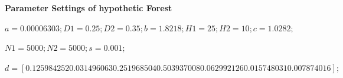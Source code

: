 \documentclass{mcmthesis}
\numberwithin{figure}{section}
\numberwithin{table}{section}
\numberwithin{equation}{section}
\begin{document}
\begin{memo}

  
\end{memo}




\newpage






\lhead{\small\sffamily \team}

\begin{appendices}

\textbf{Parameter Settings of hypothetic Forest}

$ a=0.00006303;
D1=0.25;
D2=0.35;
b=1.8218;
H1=25;
H2=10;
c=1.0282;$

$
N1=5000;
N2=5000;
s=0.001;%
$

$
d=[0.125984252 0.031496063 0.251968504 0.503937008 0.062992126 0.015748031 
0.007874016];
 $ 


\end{appendices}
\end{document}
